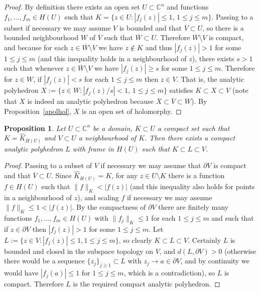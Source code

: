 \documentclass[11pt,a4paper, final, twoside]{article}
\newtheorem{proposition}[theorem]{Proposition}
\numberwithin{equation}{section}
\newcommand{\C}{\mathbb C}
\newcommand{\clos}[1]{\overline{#1}}
\newcommand{\bd}{\partial}
\newcommand{\emetric}{d}
\newcommand{\hol}{H}
\begin{document}
\begin{proof}
By definition there exists an open set $U\subset\C^n$ and functions $f_1,\dots,f_m\in\hol(U)$ such that $K=\{z\in U\colon |f_j(z)|\leq 1,\,1\leq j\leq m\}$. Passing
to a subset if necessary we may assume $V$ is bounded and that $\clos{V}\subset U$, so there is a bounded neighbourhood $W$ of $\clos{V}$ such that $\clos{W}\subset U$.
 Therefore $\clos{W}\setminus V$ is compact, and because for each $z\in \clos{W}\setminus V$ we have $z\not\in K$ and thus
$|f_j(z)|>1$ for some $1\leq j\leq m$ (and this inequality holds in a neighbourhood of $z$), there exists $s>1$ such that whenever
$z\in \clos{W}\setminus V$ we have $|f_j(z)|\geq s$ for some $1\leq j\leq m$.
Therefore for $z\in W$, if $|f_j(z)|<s$ for each $1\leq j\leq m$ then $z\in V$. That is, the analytic polyhedron
$X:=\{z\in W\colon |f_j(z)/s|<1,\,1\leq j\leq m\}$ satisfies $K\subset X\subset V$ (note that $X$ is indeed an analytic polyhedron because $\clos{X}\subset \clos{V}\subset W$).
By Proposition~\ref{apolhol}, $X$ is an open set of holomorphy.
\end{proof}
\begin{proposition}
\label{approxcapol}
Let $U\subset\C^n$ be a domain, $K\subset U$ a compact set such that $K=\hat K_{\hol(U)}$ and $V\subset U$ a neighbourhood of $K$. Then there exists a compact analytic polyhedron
$L$ with frame in $H(U)$ such that $K\subset L\subset V$.
\end{proposition}
\begin{proof}
Passing to a subset of $V$ if necessary we may assume that $\bd V$ is compact and that $\clos{V}\subset U$.
Since $\hat K_{\hol(U)}=K$, for any $z\in U\setminus K$ there is a function $f\in\hol(U)$ such that $\|f\|_K<|f(z)|$ (and this inequality also holds for points in a neighbourhood of $z$),
and scaling $f$ if necessary we may assume $\|f\|_K\leq 1<|f(z)|$. By the compactness of 
$\bd V$ there are finitely many functions $f_1,\dots,f_m\in\hol(U)$ with $\|f_j\|_K\leq 1$ for
each $1\leq j\leq m$ and
such that if $z\in \bd V$ then $|f_j(z)|>1$ for some $1\leq j\leq m$. Let $L:=\{z\in V\colon |f_j(z)|\leq 1,1\leq j\leq m\}$, so clearly $K\subset L\subset V$.
Certainly $L$ is bounded and closed in the subspace topology on $V$, and $\emetric(L,\bd V)>0$ (otherwise there would be a sequence $\{z_j\}_{j\geq 1}\subset L$ with $z_j\to a\in\bd V$,
and by continuity we would have $|f_j(a)|\leq 1$ for $1\leq j\leq m$, which is a contradiction), so $L$ is compact. Therefore $L$ is the required compact analytic polyhedron.
\end{proof}
\end{document}
